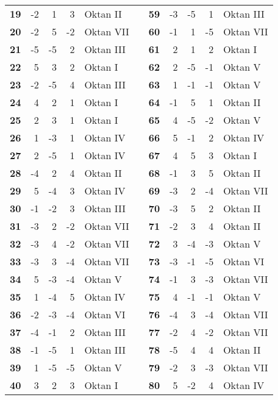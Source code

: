 \begin{longtable}[c]{rrrrlp{3.5em}rrrrl}
\textbf{19} & -2    & 1     & 3     & Oktan II &       & \textbf{59} & -3    & -5    & 1     & Oktan III \\
\textbf{20} & -2    & 5     & -2    & Oktan VII &       & \textbf{60} & -1    & 1     & -5    & Oktan VII \\
\textbf{21} & -5    & -5    & 2     & Oktan III &       & \textbf{61} & 2     & 1     & 2     & Oktan I \\
\textbf{22} & 5     & 3     & 2     & Oktan I &       & \textbf{62} & 2     & -5    & -1    & Oktan V \\
\textbf{23} & -2    & -5    & 4     & Oktan III &       & \textbf{63} & 1     & -1    & -1    & Oktan V \\
\textbf{24} & 4     & 2     & 1     & Oktan I &       & \textbf{64} & -1    & 5     & 1     & Oktan II \\
\textbf{25} & 2     & 3     & 1     & Oktan I &       & \textbf{65} & 4     & -5    & -2    & Oktan V \\
\textbf{26} & 1     & -3    & 1     & Oktan IV &       & \textbf{66} & 5     & -1    & 2     & Oktan IV \\
\textbf{27} & 2     & -5    & 1     & Oktan IV &       & \textbf{67} & 4     & 5     & 3     & Oktan I \\
\textbf{28} & -4    & 2     & 4     & Oktan II &       & \textbf{68} & -1    & 3     & 5     & Oktan II \\
\textbf{29} & 5     & -4    & 3     & Oktan IV &       & \textbf{69} & -3    & 2     & -4    & Oktan VII \\
\textbf{30} & -1    & -2    & 3     & Oktan III &       & \textbf{70} & -3    & 5     & 2     & Oktan II \\
\textbf{31} & -3    & 2     & -2    & Oktan VII &       & \textbf{71} & -2    & 3     & 4     & Oktan II \\
\textbf{32} & -3    & 4     & -2    & Oktan VII &       & \textbf{72} & 3     & -4    & -3    & Oktan V \\
\textbf{33} & -3    & 3     & -4    & Oktan VII &       & \textbf{73} & -3    & -1    & -5    & Oktan VI \\
\textbf{34} & 5     & -3    & -4    & Oktan V &       & \textbf{74} & -1    & 3     & -3    & Oktan VII \\
\textbf{35} & 1     & -4    & 5     & Oktan IV &       & \textbf{75} & 4     & -1    & -1    & Oktan V \\
\textbf{36} & -2    & -3    & -4    & Oktan VI &       & \textbf{76} & -4    & 3     & -4    & Oktan VII \\
\textbf{37} & -4    & -1    & 2     & Oktan III &       & \textbf{77} & -2    & 4     & -2    & Oktan VII \\
\textbf{38} & -1    & -5    & 1     & Oktan III &       & \textbf{78} & -5    & 4     & 4     & Oktan II \\
\textbf{39} & 1     & -5    & -5    & Oktan V &       & \textbf{79} & -2    & 3     & -3    & Oktan VII \\
\textbf{40} & 3     & 2     & 3     & Oktan I &       & \textbf{80} & 5     & -2    & 4     & Oktan IV 
\end{longtable}
